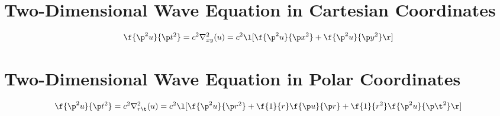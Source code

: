 \chapter{Two-Dimensional Wave Equation in Cartesian Coordinates}
\begin{comment}
Physics Archives
\end{comment}
$$\f{\p^2u}{\p t^2} = c^2\nabla^2_{xy}(u) = c^2\l[\f{\p^2u}{\p x^2} + \f{\p^2u}{\p y^2}\r]$$
\chapter{Two-Dimensional Wave Equation in Polar Coordinates}
\begin{comment}
Physics Archives
\end{comment}
$$\f{\p^2u}{\p t^2} = c^2\nabla^2_{r\t}(u) = c^2\l[\f{\p^2u}{\p r^2} + \f{1}{r}\f{\p u}{\p r} + \f{1}{r^2}\f{\p^2u}{\p \t^2}\r]$$
